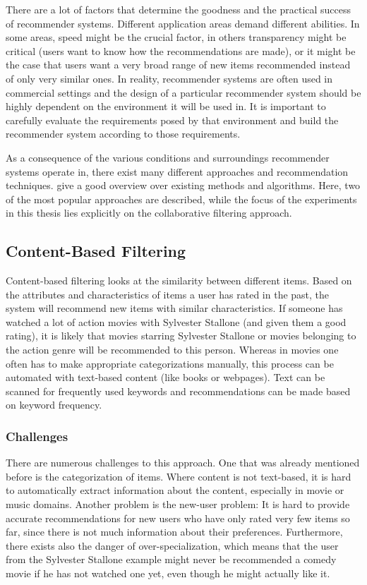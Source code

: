 There are a lot of factors that determine the goodness and the practical success of recommender systems. Different application areas demand different abilities. In some areas, speed might be the crucial factor, in others transparency might be critical (users want to know how the recommendations are made), or it might be the case that users want a very broad range of new items recommended instead of only very similar ones. In reality, recommender systems are often used in commercial settings and the design of a particular recommender system should be highly dependent on the environment it will be used in. It is important to carefully evaluate the requirements posed by that environment and build the recommender system according to those requirements.
\newline

As a consequence of the various conditions and surroundings recommender systems operate in, there exist many different approaches and recommendation techniques. \cite{Ricci_2011} give a good overview over existing methods and algorithms. Here, two of the most popular approaches are described, while the focus of the experiments in this thesis lies explicitly on the collaborative filtering approach.

\subsection{Content-Based Filtering}
\label{sst:contentbasedfiltering} Content-based filtering looks at the similarity between different items. Based on the attributes and characteristics of items a user has rated in the past, the system will recommend new items with similar characteristics. If someone has watched a lot of action movies with Sylvester Stallone (and given them a good rating), it is likely that movies starring Sylvester Stallone or movies belonging to the action genre will be recommended to this person. Whereas in movies one often has to make appropriate categorizations manually, this process can be automated with text-based content (like books or webpages). Text can be scanned for frequently used keywords and recommendations can be made based on keyword frequency.

\subsubsection{Challenges}
\label{ssst:challenges} There are numerous challenges to this approach. One that was already mentioned before is the categorization of items. Where content is not text-based, it is hard to automatically extract information about the content, especially in movie or music domains. Another problem is the new-user problem: It is hard to provide accurate recommendations for new users who have only rated very few items so far, since there is not much information about their preferences. Furthermore, there exists also the danger of over-specialization, which means that the user from the Sylvester Stallone example might never be recommended a comedy movie if he has not watched one yet, even though he might actually like it.


